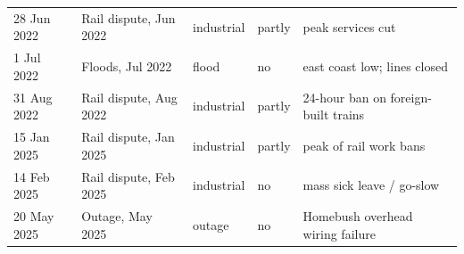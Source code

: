 {\begin{longtable}{@{}lllll@{}}
28 Jun 2022 & Rail dispute, Jun 2022 & industrial & partly & \parbox[t]{4.9cm}{\raggedright peak services cut\strut} \\
1 Jul 2022 & Floods, Jul 2022 & flood & no & \parbox[t]{4.9cm}{\raggedright east coast low; lines closed\strut} \\
31 Aug 2022 & Rail dispute, Aug 2022 & industrial & partly & \parbox[t]{4.9cm}{\raggedright 24-hour ban on foreign-built trains\strut} \\
15 Jan 2025 & Rail dispute, Jan 2025 & industrial & partly & \parbox[t]{4.9cm}{\raggedright peak of rail work bans\strut} \\
14 Feb 2025 & Rail dispute, Feb 2025 & industrial & no & \parbox[t]{4.9cm}{\raggedright mass sick leave / go-slow\strut} \\
20 May 2025 & Outage, May 2025 & outage & no & \parbox[t]{4.9cm}{\raggedright Homebush overhead wiring failure\strut} \\
\bottomrule
\end{longtable}}
